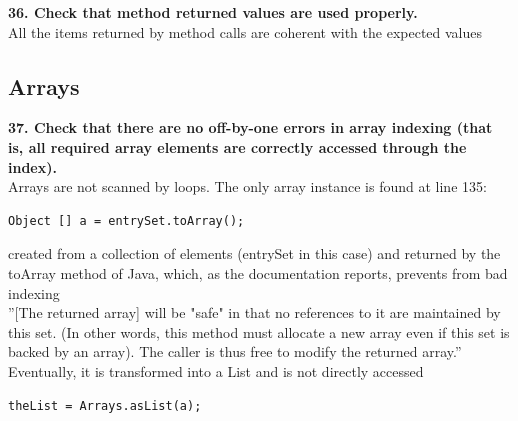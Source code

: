 \documentclass{article}
\begin{document}
\begin{flushleft}
\textbf{36. Check that method returned values are used properly.}\\
\vspace{0.5cm}
All the items returned by method calls are coherent with the expected values \\
\vspace{0.5cm}




\subsection{Arrays}
\textbf{37. Check that there are no off-by-one errors in array indexing (that is, all required array elements are correctly accessed through the index).}\\
\vspace{0.5cm}
Arrays are not scanned by loops. The only array instance is found at   line 135:\\
\vspace{0.5cm}
\begin{lstlisting}
Object [] a = entrySet.toArray();       
\end{lstlisting}
\vspace{0.5cm}
created from a collection of elements (entrySet in this case) and returned  by the toArray method of Java, which, as the documentation reports, prevents from bad indexing\\
\vspace{0.5cm}
''[The returned array] will be "safe" in that no references to it are maintained by this set. (In other words, this method must allocate a new array even if this set is backed by an array). The caller is thus free to modify the returned array.''\\
\vspace{0.5cm}
 Eventually, it is transformed into a List and is not directly accessed \\
 \vspace{0.5cm}    
 \begin{lstlisting}                 
theList = Arrays.asList(a);
\end{lstlisting}
\vspace{0.5cm}


\end{flushleft}
\end{document}
